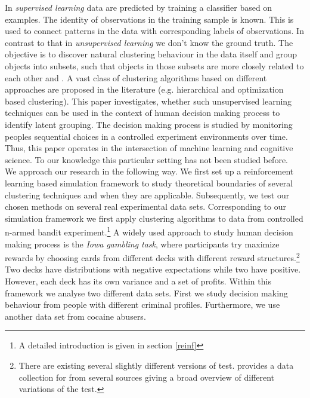 \documentclass[12pt,a4paper,bibliography=totocnumbered,listof=totocnumbered]{scrartcl}
\begin{document}
In \textit{supervised learning} data are predicted by training a classifier based on examples. The identity of observations in the training sample is known. This is used to connect patterns in the data with corresponding labels of observations. In contrast to that in \textit{unsupervised learning} we don't know the ground truth. The objective is to discover natural clustering behaviour in the data itself and group objects into subsets, such that objects in those subsets are more closely related to each other \cite[page 9 et. seqq.]{Murphy2012} and \cite[page 501 et. seqq.]{hastie}. A vast class of clustering algorithms based on different approaches are proposed in the literature (e.g. hierarchical and optimization based clustering). This paper investigates, whether such unsupervised learning techniques can be used in the context of human decision making process to identify latent grouping. The decision making process is studied by monitoring peoples sequential choices in a controlled experiment environments over time. Thus, this paper operates in the intersection of machine learning and cognitive science. To our knowledge this particular setting has not been studied before.\\
We approach our research in the following way. We first set up a reinforcement learning based simulation framework to study theoretical boundaries of several clustering techniques and when they are applicable.
 Subsequently, we test our chosen methods on several  real experimental data sets. Corresponding to our simulation framework we first apply clustering algorithms to data from controlled n-armed bandit experiment.\footnote{A detailed introduction is given in section \ref{reinf}} A widely used approach to study human decision making process is the \textit{Iowa gambling task}, where participants try maximize rewards by choosing cards from different decks with different reward structures.\footnote{There are existing several slightly different versions of test. \cite{Steingroever2015} provides a data collection for from several sources giving a broad overview of different variations of the test.} Two decks have distributions with negative expectations while two have positive. However, each deck has its own variance and a set of profits.  Within this framework we analyse two different data sets. First we study decision making behaviour from people with different criminal profiles. Furthermore, we use another data set from cocaine abusers.\\
\end{document}

